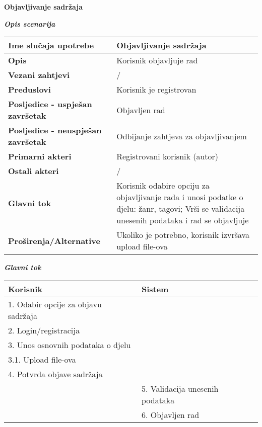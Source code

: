 \documentclass[12pt, a4paper]{report}
\begin{document}
\begin{flushleft}
{\large\textbf{Objavljivanje sadržaja}}  \newline

\textbf{\textit{Opis scenarija}} \\
\begin{tabular}{|m{7cm}|m{7cm}|} 
 \hline
 \textbf{Ime slučaja upotrebe} & Objavljivanje sadržaja \\ 
 \hline
 \textbf{Opis} & Korisnik objavljuje rad \\ 
 \hline
 \textbf{Vezani zahtjevi} & / \\ 
 \hline
 \textbf{Preduslovi} & Korisnik je registrovan \\ 
 \hline
 \textbf{Posljedice - uspješan završetak} & Objavljen rad \\ 
 \hline
 \textbf{Posljedice - neuspješan završetak} & Odbijanje zahtjeva za objavljivanjem \\ 
 \hline
 \textbf{Primarni akteri} & Registrovani korisnik (autor) \\ 
 \hline
 \textbf{Ostali akteri} & / \\ 
 \hline
 \textbf{Glavni tok} & Korisnik odabire opciju za objavljivanje rada i unosi podatke o djelu: žanr, tagovi; Vrši se validacija unesenih podataka i rad se objavljuje \\ 
 \hline
 \textbf{Proširenja/Alternative} & Ukoliko je potrebno, korisnik izvršava upload file-ova \\ 
 \hline
\end{tabular} \newpage

\textbf{\textit{Glavni tok}}
\begin{tabular}{|m{7cm}|m{7cm}|}
\hline
\textbf{Korisnik} & \textbf{Sistem} \\
\hline
1. Odabir opcije za objavu sadržaja &  \\
\hline
2. Login/registracija &  \\
\hline
3. Unos osnovnih podataka o djelu &  \\
\hline
3.1. Upload file-ova &  \\
\hline
4. Potvrda objave sadržaja &  \\
\hline
 & 5. Validacija unesenih podataka \\
\hline
 & 6. Objavljen rad \\
\hline
\end{tabular} \newline \newline


\end{flushleft}
\end{document}
